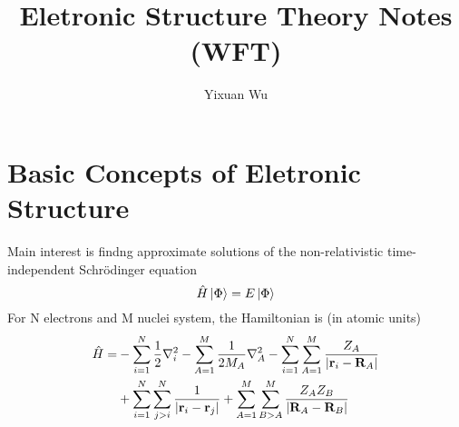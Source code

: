 \documentclass[11pt]{article}
\title{Eletronic Structure Theory Notes (WFT)}
\author{Yixuan Wu}
\begin{document}
\maketitle
\section{Basic Concepts of Eletronic Structure}
Main interest is findng approximate solutions of the non-relativistic time-independent Schr\"odinger equation
\begin{equation}
    \Hat{H}\ket{\Phi}=E\ket{\Phi}
\end{equation}
For N electrons and M nuclei system, the Hamiltonian is (in atomic units)
\begin{equation}
    \begin{split}
        \Hat{H}= & -\sum_{i=1}^{N}\frac{1}{2}\nabla_{i}^{2}-\sum_{A=1}^{M}\frac{1}{2M_A}\nabla_{A}^{2}
-\sum_{i=1}^{N}\sum_{A=1}^{M}\frac{Z_A}{|\mathbf{r}_i-\mathbf{R}_A|}\\ &+\sum_{i=1}^{N}\sum_{j>i}^{N}\frac{1}{|\mathbf{r}_i-\mathbf{r}_j|}
+\sum_{A=1}^{M}\sum_{B>A}^{M}\frac{Z_{A}Z_{B}}{|\mathbf{R}_A-\mathbf{R}_B|}
    \end{split}
\end{equation}
\end{document}
